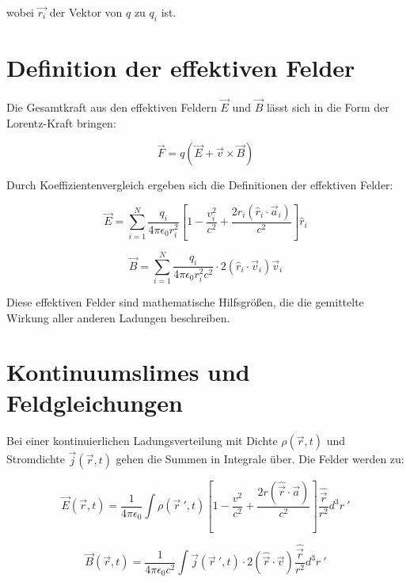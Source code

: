 wobei $\vec{r_i}$ der Vektor von $q$ zu $q_i$ ist.

\section{Definition der effektiven Felder}
Die Gesamtkraft aus den effektiven Feldern $\vec{E}$ und $\vec{B}$ lässt sich in die Form der Lorentz-Kraft bringen:

\begin{equation}
    \label{eq:lorentz_kraft}
    \vec{F} = q \left( \vec{E} + \vec{v} \times \vec{B} \right)
\end{equation}

Durch Koeffizientenvergleich ergeben sich die Definitionen der effektiven Felder:

\begin{equation}
    \vec{E} = \sum_{i=1}^N \frac{q_i}{4\pi\epsilon_0 r_i^2} \left[ 1 - \frac{v_i^2}{c^2} + \frac{2r_i(\hat{r}_i\cdot\vec{a}_i)}{c^2} \right] \hat{r}_i
\end{equation}

\begin{equation}
    \vec{B} = \sum_{i=1}^N \frac{q_i}{4\pi\epsilon_0 r_i^2 c^2} \cdot 2(\hat{r}_i\cdot\vec{v}_i) \vec{v}_i
\end{equation}

Diese effektiven Felder sind mathematische Hilfsgrößen, die die gemittelte Wirkung aller anderen Ladungen beschreiben.

\section{Kontinuumslimes und Feldgleichungen}
Bei einer kontinuierlichen Ladungsverteilung mit Dichte $\rho(\vec{r}, t)$ und Stromdichte $\vec{j}(\vec{r},t)$ gehen die Summen in Integrale über. Die Felder werden zu:

\begin{equation}
    \vec{E}(\vec{r}, t) = \frac{1}{4\pi\epsilon_0} \int \rho(\vec{r}~', t) \left[ 1 - \frac{v^2}{c^2} + \frac{2r(\hat{\vec{r}}\cdot\vec{a})}{c^2} \right] \frac{\hat{\vec{r}}}{r^2}  d^3r~'
\end{equation}

\begin{equation}
    \vec{B}(\vec{r}, t) = \frac{1}{4\pi\epsilon_0 c^2} \int \vec{j}(\vec{r}~', t) \cdot 2(\hat{\vec{r}}\cdot\vec{v}) \frac{\hat{\vec{r}}}{r^2}  d^3r~'
\end{equation}

